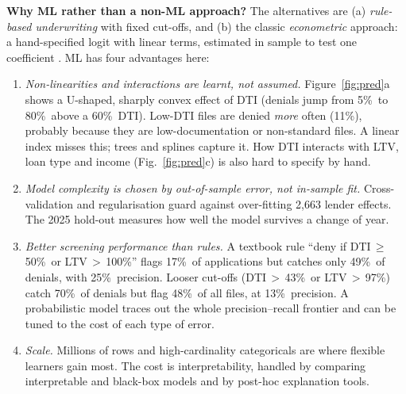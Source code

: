 \documentclass[11pt,a4paper]{article}
\newcommand{\pct}{\%}
\begin{document}
\textbf{Why ML rather than a non-ML approach?} The alternatives are
(a) \emph{rule-based underwriting} with fixed cut-offs, and (b) the classic
\emph{econometric} approach: a hand-specified logit with linear terms, estimated in
sample to test one coefficient \cite{munnell1996}. ML has four advantages here:
\begin{enumerate}
  \item \emph{Non-linearities and interactions are learnt, not assumed.} Figure~\ref{fig:pred}a
  shows a U-shaped, sharply convex effect of DTI (denials jump from 5\pct\ to 80\pct\
  above a 60\pct\ DTI). Low-DTI files are denied \emph{more} often (11\pct), probably
  because they are low-documentation or non-standard files. A linear index misses
  this; trees and splines capture it. How DTI interacts with LTV, loan type and income
  (Fig.~\ref{fig:pred}c) is also hard to specify by hand.
  \item \emph{Model complexity is chosen by out-of-sample error, not in-sample
  fit.} Cross-validation and regularisation guard against over-fitting 2{,}663 lender
  effects. The 2025 hold-out measures how well the model survives a change of year.
  \item \emph{Better screening performance than rules.} A textbook rule ``deny if
  DTI\,$\geq$\,50\pct\ or LTV\,$>$\,100\pct'' flags 17\pct\ of applications but
  catches only 49\pct\ of denials, with 25\pct\ precision. Looser cut-offs
  (DTI\,$>$\,43\pct\ or LTV\,$>$\,97\pct) catch 70\pct\ of denials but flag 48\pct\ of
  all files, at 13\pct\ precision. A probabilistic model traces out the whole
  precision--recall frontier and can be tuned to the cost of each type of error.
  \item \emph{Scale.} Millions of rows and high-cardinality categoricals are where
  flexible learners gain most. The cost is interpretability, handled by comparing
  interpretable and black-box models and by post-hoc explanation tools.
\end{enumerate}
\end{document}
